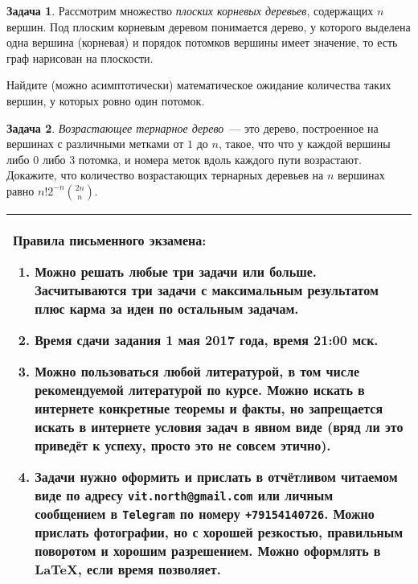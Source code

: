 \documentclass[a5paper]{article}
\theoremstyle{definition}
\newtheorem{problem}{Задача}
\begin{document}
\begin{problem}
    Рассмотрим множество \emph{плоских корневых деревьев}, содержащих \( n \)
вершин. Под плоским корневым деревом понимается дерево, у которого выделена одна
вершина (корневая) и порядок потомков вершины имеет значение, то есть граф
нарисован на плоскости.

Найдите (можно асимптотически) математическое ожидание количества таких вершин, у
которых ровно один потомок.
\end{problem}

\begin{problem}
\emph{Возрастающее тернарное дерево}~--- это дерево, построенное на вершинах с
различными метками от \( 1 \) до \( n \), такое, что что у каждой вершины
либо \( 0 \) либо \( 3 \) потомка, и номера меток вдоль каждого пути возрастают.
Докажите, что количество возрастающих тернарных деревьев на \( n \) вершинах 
равно \( n! 2^{-n} { 2n \choose n} \).
\end{problem}

\vspace{1cm}

\begin{center}
\begin{tabular}{|p{10cm}|}
\hline
\textbf{Правила письменного экзамена: }
\begin{enumerate}
\item Можно решать любые три задачи или больше. Засчитываются три задачи с
максимальным результатом плюс карма за идеи по остальным задачам.
\item Время сдачи задания 1 мая 2017 года, время 21:00 мск.
\item Можно пользоваться любой литературой, в том числе рекомендуемой
литературой по курсе. Можно искать в интернете конкретные теоремы и
факты, но запрещается искать в интернете условия задач в явном виде (вряд ли это
приведёт к успеху, просто это не совсем этично).
\item Задачи нужно оформить и прислать в отчётливом читаемом виде по адресу 
\texttt{vit.north@gmail.com} или личным сообщением в \texttt{Telegram} по номеру
\texttt{+79154140726}. Можно прислать
фотографии, но с хорошей резкостью, правильным поворотом и хорошим разрешением.
Можно оформлять в \LaTeX, если время позволяет.
\end{enumerate}
\\
\hline
\end{tabular}
\end{center}
\end{document}
